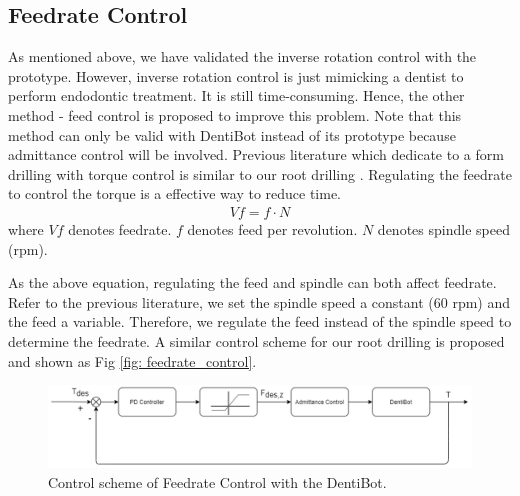 \subsection{Feedrate Control}
\label{sec:Feed Control}
\hspace*{6mm}As mentioned above, we have validated the inverse rotation control with the prototype. However, inverse rotation control is just mimicking a dentist to perform endodontic treatment. It is still time-consuming. Hence, the other method - feed control is proposed to improve this problem. Note that this method can only be valid with DentiBot instead of its prototype because admittance control will be involved. Previous literature which dedicate to a form drilling with torque control is similar to our root drilling \cite{boessler2009effect}. Regulating the feedrate to control the torque is a effective way to reduce time. 
\begin{equation*}
\begin{split}
V\!f = f \cdot N
\end{split}
\end{equation*}
where $V\!f$ denotes feedrate. $f$ denotes feed per revolution. $N$ denotes spindle speed (rpm).
\par
As the above equation, regulating the feed and spindle can both affect feedrate. Refer to the previous literature, we set the spindle speed a constant ($60$ rpm) and the feed a variable. Therefore, we regulate the feed instead of the spindle speed to determine the feedrate. A similar control scheme for our root drilling is proposed and shown as Fig \ref{fig: feedrate_control}.
\begin{figure}[htbp]
\begin{center}
\includegraphics[width=1\linewidth]{Images/feedrate_control.png}
\caption{Control scheme of Feedrate Control with the DentiBot.}
\label{fig: feedarte_control}
\end{center}
\end{figure}
\par
